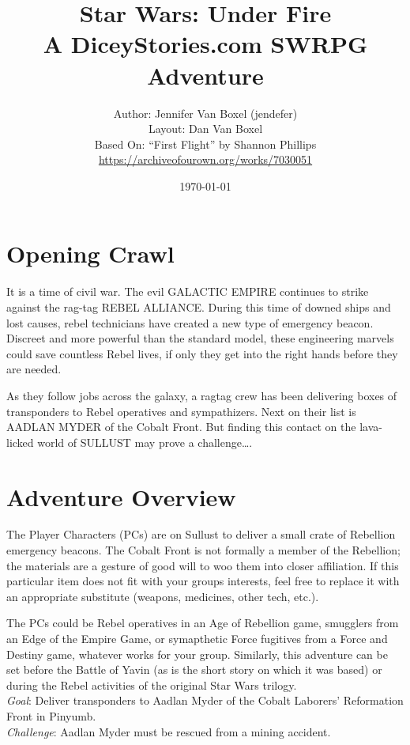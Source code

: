 \documentclass{book}
\title{
Star Wars: Under Fire \\
A DiceyStories.com SWRPG Adventure\\
}
\author{Author: Jennifer Van Boxel (jendefer)\\
        Layout: Dan Van Boxel\\
        Based On: ``First Flight'' by Shannon Phillips \\\url{https://archiveofourown.org/works/7030051}}
\date{\today}
\begin{document}
\maketitle


\begin{multicols*}{2}
\section{Opening Crawl}


It is a time of civil war. The evil GALACTIC EMPIRE continues to strike against the rag-tag REBEL ALLIANCE. During this time of downed ships and lost causes, rebel technicians have created a new type of emergency beacon. Discreet and more powerful than the standard model, these engineering marvels could save countless Rebel lives, if only they get into the right hands before they are needed.

As they follow jobs across the galaxy, a ragtag crew has been delivering boxes of transponders to Rebel operatives and sympathizers. Next on their list is AADLAN MYDER of the Cobalt Front. But finding this contact on the lava-licked world of SULLUST may prove a challenge….



\section{Adventure Overview }

    The Player Characters (PCs) are on Sullust to deliver a small crate of Rebellion emergency beacons. The Cobalt Front is not formally a member of the Rebellion; the materials are a gesture of good will to woo them into closer affiliation. If this particular item does not fit with your groups interests, feel free to replace it with an appropriate substitute (weapons, medicines, other tech, etc.).

The PCs could be Rebel operatives in an Age of Rebellion game, smugglers from an Edge of the Empire Game, or symapthetic Force fugitives from a Force and Destiny game, whatever works for your group. Similarly, this adventure can be set before the Battle of Yavin (as is the short story on which it was based) or during the Rebel activities of the original Star Wars trilogy.\\
\emph{Goal}: Deliver transponders to Aadlan Myder of the Cobalt Laborers’ Reformation Front in Pinyumb.\\
\emph{Challenge}: Aadlan Myder must be rescued from a mining accident.


\end{multicols*}
\end{document}

